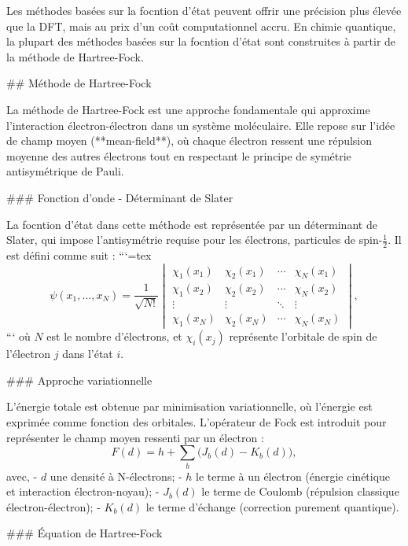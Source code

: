 \documentclass[12pt,a4paper]{report}
\begin{document}
\begin{markdown}
Les méthodes basées sur la focntion d'état peuvent offrir une précision plus élevée que la DFT, mais au prix d'un coût computationnel accru. En chimie quantique, la plupart des méthodes basées sur la focntion d'état sont construites à partir de la méthode de Hartree-Fock.

## Méthode de Hartree-Fock

La méthode de Hartree-Fock est une approche fondamentale qui approxime l’interaction électron-électron dans un système moléculaire. Elle repose sur l'idée de champ moyen (**mean-field**), où chaque électron ressent une répulsion moyenne des autres électrons tout en respectant le principe de symétrie antisymétrique de Pauli.

### Fonction d'onde - Déterminant de Slater

La focntion d'état dans cette méthode est représentée par un déterminant de Slater, qui impose l'antisymétrie requise pour les électrons, particules de spin-$\frac12$. Il est défini comme suit :
```{=tex}
\begin{equation}
\psi(x_1, \ldots, x_N) = \frac{1}{\sqrt{N!}}
\begin{vmatrix}
\chi_1(x_1) & \chi_2(x_1) & \cdots & \chi_N(x_1) \\
\chi_1(x_2) & \chi_2(x_2) & \cdots & \chi_N(x_2) \\
\vdots & \vdots & \ddots & \vdots \\
\chi_1(x_N) & \chi_2(x_N) & \cdots & \chi_N(x_N)
\end{vmatrix} ,
\end{equation}
```
où $N$ est le nombre d'électrons, et $\chi_i(x_j)$ représente l'orbitale de spin de l'électron $j$ dans l'état $i$.

### Approche variationnelle

L’énergie totale est obtenue par minimisation variationnelle, où l'énergie est exprimée comme fonction des orbitales. L'opérateur de Fock est introduit pour représenter le champ moyen ressenti par un électron :
\begin{equation}
F(d) = h + \sum_b \big(J_b(d) - K_b(d)\big) ,
\end{equation}
avec,
- $d$ une densité à N-électrons;
- $h$ le terme à un électron (énergie cinétique et interaction électron-noyau);
- $J_b(d)$ le terme de Coulomb (répulsion classique électron-électron);
- $K_b(d)$ le terme d'échange (correction purement quantique).

### Équation de Hartree-Fock


\end{markdown}
\end{document}
